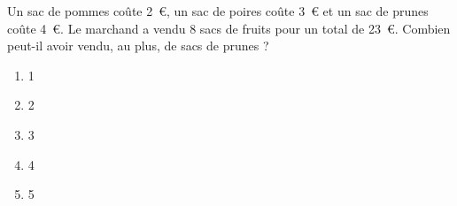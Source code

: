 Un sac de pommes coûte 2~\textgreek{\euro}, un sac de poires coûte 3~\textgreek{\euro} et un sac de prunes coûte 4~\textgreek{\euro}. Le marchand a vendu 8 sacs de fruits pour un total de 23~\textgreek{\euro}. Combien peut-il avoir vendu, au plus, de sacs de prunes ?
\begin{multicols}{5}
  \begin{enumerate}[A/]
  \item 1
  \item 2
  \item 3
  \item 4
  \item 5
  \end{enumerate}
\end{multicols}